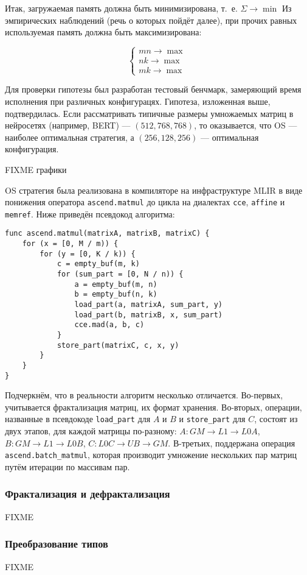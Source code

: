 Итак, загружаемая память должна быть минимизирована, т.~е. $\Sigma \rightarrow \min$
Из эмпирических наблюдений (речь о которых пойдёт далее), при прочих равных используемая
память должна быть максимизирована:

\[
\begin{cases}
    mn \rightarrow \max \\
    nk \rightarrow \max \\
    mk \rightarrow \max
\end{cases}
\]

Для проверки гипотезы был разработан тестовый бенчмарк, замеряющий время
исполнения при различных конфигурацях. Гипотеза, изложенная выше, подтвердилась.
Если рассматривать типичные размеры умножаемых матриц в нейросетях (например,
BERT) --- $(512, 768, 768)$, то оказывается, что OS --- наиболее оптимальная
стратегия, а $(256, 128, 256)$ --- оптимальная конфигурация.

FIXME графики

OS стратегия была реализована в компиляторе на инфраструктуре MLIR в виде
понижения оператора \texttt{ascend.matmul} до цикла на диалектах \texttt{cce},
\texttt{affine} и \texttt{memref}. Ниже приведён псевдокод алгоритма:

\begin{lstlisting}
func ascend.matmul(matrixA, matrixB, matrixC) {
    for (x = [0, M / m)) {
        for (y = [0, K / k)) {
            c = empty_buf(m, k)
            for (sum_part = [0, N / n)) {
                a = empty_buf(m, n)
                b = empty_buf(n, k)
                load_part(a, matrixA, sum_part, y)
                load_part(b, matrixB, x, sum_part)
                cce.mad(a, b, c)
            }
            store_part(matrixC, c, x, y)
        }
    }
}
\end{lstlisting}

Подчеркнём, что в реальности алгоритм несколько отличается. Во-первых,
учитывается фрактализация матриц, их формат хранения. Во-вторых, операции,
названные в псевдокоде \texttt{load\_part} для $A$ и $B$ и \texttt{store\_part}
для $C$, состоят из двух этапов, для каждой матрицы по-разному:
$A: GM \rightarrow L1 \rightarrow L0A$, $B: GM \rightarrow L1 \rightarrow L0B$,
$C: L0C \rightarrow UB \rightarrow GM$. В-третьих, поддержана операция
\texttt{ascend.batch\_matmul}, которая производит умножение нескольких пар матриц
путём итерации по массивам пар.

\subsubsection{Фрактализация и дефрактализация}

FIXME

\subsubsection{Преобразование типов}

FIXME
